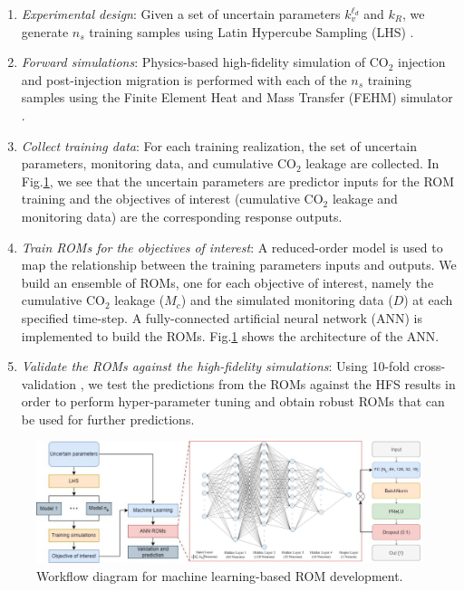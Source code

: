 \documentclass[a4paper,fleqn]{cas-sc}
\begin{document}
\begin{enumerate}[Step 1.]
\item \textit{Experimental design}: Given a set of uncertain parameters $k_{v}^{\ell_d}$ and $k_R$, we generate $n_s$ training samples using Latin Hypercube Sampling (LHS) \citep{Iman2008, Helton2003LatinSystems}.
\item \textit{Forward simulations}: Physics-based high-fidelity simulation of CO$_2$ injection and post-injection migration is performed with each of the $n_s$ training samples using the Finite Element Heat and Mass Transfer (FEHM) simulator \citep{Zyvoloski1997}. 
\item \textit{Collect training data}: For each training realization, the set of uncertain parameters, monitoring data, and cumulative CO$_2$ leakage are collected. In Fig.\ref{mlrom}, we see that the uncertain parameters are predictor inputs for the ROM training and the objectives of interest (cumulative CO$_2$ leakage and monitoring data) are the corresponding response outputs. 
\item \textit{Train ROMs for the objectives of interest}: A reduced-order model is used to map the relationship between the training parameters inputs and outputs. We build an ensemble of ROMs, one for each objective of interest, namely the cumulative CO$_2$ leakage ($M_c$) and the simulated monitoring data ($D$) at each specified time-step. A fully-connected artificial neural network (ANN) is implemented to build the ROMs. Fig.\ref{mlrom} shows the architecture of the ANN.
\item \textit{Validate the ROMs against the high-fidelity simulations}: Using 10-fold cross-validation \citep{Xu2018249}, we test the predictions from the ROMs against the HFS results in order to perform hyper-parameter tuning and obtain robust ROMs that can be used for further predictions.
\end{enumerate}

\begin{figure}
    \centering
    \includegraphics[width=16cm]{figs/Figure 1.pdf}
    \caption{Workflow diagram for machine learning-based ROM development.}
    \label{mlrom}
\end{figure}
\end{document}
